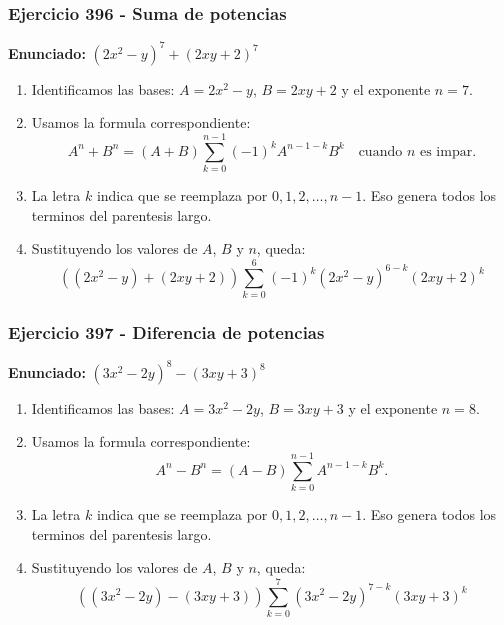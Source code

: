 \documentclass[11pt,a4paper]{article}
\begin{document}
\subsubsection*{Ejercicio 396 - Suma de potencias}
\textbf{Enunciado:} $ \left(2 x^{2} - y\right)^{7}+\left(2 x y + 2\right)^{7} $\par
\begin{enumerate}[leftmargin=2em]
\item Identificamos las bases: \(A=2 x^{2} - y\), \(B=2 x y + 2\) y el exponente \(n=7\).
\item Usamos la formula correspondiente: \[A^n+B^n=(A+B)\sum_{k=0}^{n-1}(-1)^kA^{n-1-k}B^k\quad\text{cuando }n\text{ es impar}.\]
\item La letra \(k\) indica que se reemplaza por \(0,1,2,\ldots,n-1\). Eso genera todos los terminos del parentesis largo.
\item Sustituyendo los valores de \(A\), \(B\) y \(n\), queda: \[\boxed{\left(\left(2 x^{2} - y\right)+\left(2 x y + 2\right)\right)\sum_{k=0}^{6}(-1)^k\left(2 x^{2} - y\right)^{6-k}\left(2 x y + 2\right)^k}\]
\end{enumerate}

\vspace{0.2cm}
\subsubsection*{Ejercicio 397 - Diferencia de potencias}
\textbf{Enunciado:} $ \left(3 x^{2} - 2 y\right)^{8}-\left(3 x y + 3\right)^{8} $\par
\begin{enumerate}[leftmargin=2em]
\item Identificamos las bases: \(A=3 x^{2} - 2 y\), \(B=3 x y + 3\) y el exponente \(n=8\).
\item Usamos la formula correspondiente: \[A^n-B^n=(A-B)\sum_{k=0}^{n-1}A^{n-1-k}B^k.\]
\item La letra \(k\) indica que se reemplaza por \(0,1,2,\ldots,n-1\). Eso genera todos los terminos del parentesis largo.
\item Sustituyendo los valores de \(A\), \(B\) y \(n\), queda: \[\boxed{\left(\left(3 x^{2} - 2 y\right)-\left(3 x y + 3\right)\right)\sum_{k=0}^{7}\left(3 x^{2} - 2 y\right)^{7-k}\left(3 x y + 3\right)^k}\]
\end{enumerate}

\vspace{0.2cm}
\end{document}
